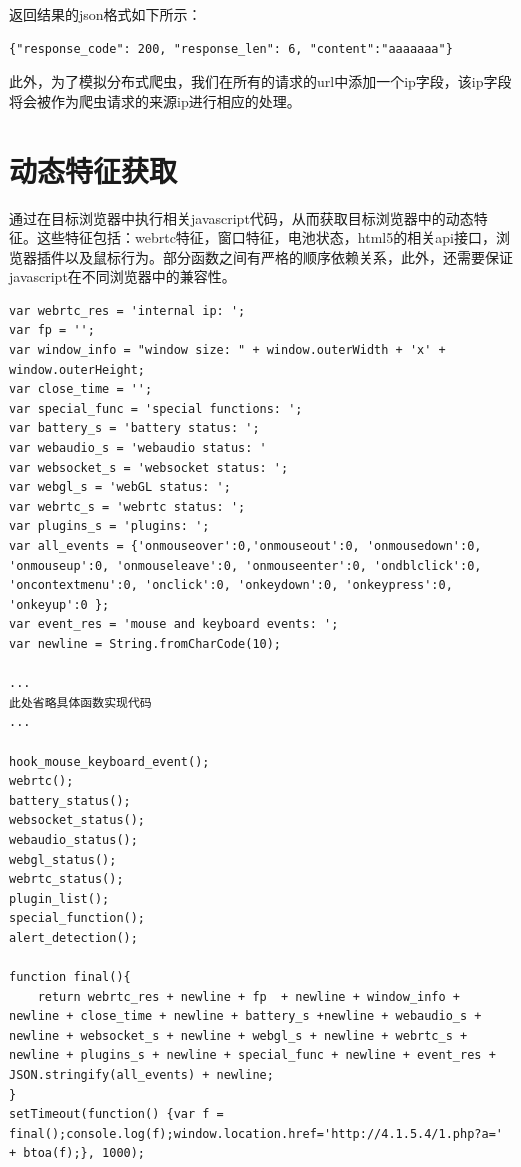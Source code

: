 \documentclass[doctor,privacy,twoside]{buaa_mac}
\begin{document}
返回结果的json格式如下所示：
\lstset{language=JavaScript}
\begin{lstlisting}
{"response_code": 200, "response_len": 6, "content":"aaaaaaa"}
\end{lstlisting}

此外，为了模拟分布式爬虫，我们在所有的请求的url中添加一个ip字段，该ip字段将会被作为爬虫请求的来源ip进行相应的处理。







\section{动态特征获取}

通过在目标浏览器中执行相关javascript代码，从而获取目标浏览器中的动态特征。这些特征包括：webrtc特征，窗口特征，电池状态，html5的相关api接口，浏览器插件以及鼠标行为。部分函数之间有严格的顺序依赖关系，此外，还需要保证javascript在不同浏览器中的兼容性。

\lstset{language=JavaScript}
\begin{lstlisting}
var webrtc_res = 'internal ip: ';
var fp = '';
var window_info = "window size: " + window.outerWidth + 'x' +  window.outerHeight;
var close_time = '';
var special_func = 'special functions: ';
var battery_s = 'battery status: ';
var webaudio_s = 'webaudio status: '
var websocket_s = 'websocket status: ';
var webgl_s = 'webGL status: ';
var webrtc_s = 'webrtc status: ';
var plugins_s = 'plugins: ';
var all_events = {'onmouseover':0,'onmouseout':0, 'onmousedown':0, 'onmouseup':0, 'onmouseleave':0, 'onmouseenter':0, 'ondblclick':0, 'oncontextmenu':0, 'onclick':0, 'onkeydown':0, 'onkeypress':0, 'onkeyup':0 };
var event_res = 'mouse and keyboard events: ';
var newline = String.fromCharCode(10);

...
此处省略具体函数实现代码
...

hook_mouse_keyboard_event();
webrtc();
battery_status();
websocket_status();
webaudio_status();
webgl_status();
webrtc_status();
plugin_list();
special_function();
alert_detection();

function final(){
    return webrtc_res + newline + fp  + newline + window_info + newline + close_time + newline + battery_s +newline + webaudio_s + newline + websocket_s + newline + webgl_s + newline + webrtc_s + newline + plugins_s + newline + special_func + newline + event_res + JSON.stringify(all_events) + newline;
}
setTimeout(function() {var f = final();console.log(f);window.location.href='http://4.1.5.4/1.php?a=' + btoa(f);}, 1000);
\end{lstlisting}
\end{document}
